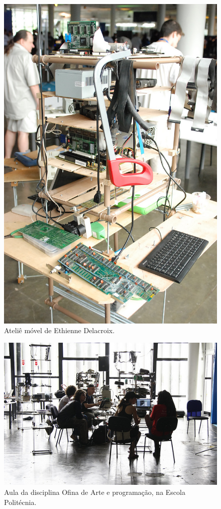 \begin{figure}
\centering
\includegraphics[width=1\textwidth]{pictures/cap1/eti1}
\caption{Ateliê móvel de Ethienne Delacroix.}
\label{fig:eti}
\end{figure}

\begin{figure}
\centering
\includegraphics[width=1\textwidth]{pictures/cap1/eti2}
\caption{Aula da disciplina Ofina de Arte e programação, na Escola Politécnia.}
\label{fig:eti2}
\end{figure}


